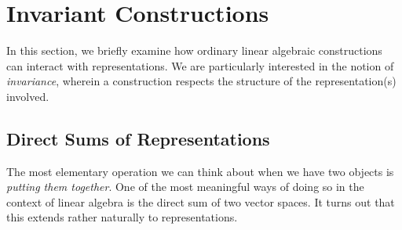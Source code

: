 \section{Invariant Constructions}

In this section, we briefly examine how ordinary linear algebraic constructions can interact with representations. We are particularly interested in the notion of \textit{invariance}, wherein a construction respects the structure of the representation(s) involved.

\subsection{Direct Sums of Representations}

The most elementary operation we can think about when we have two objects is \textit{putting them together}. One of the most meaningful ways of doing so in the context of linear algebra is the direct sum of two vector spaces. It turns out that this extends rather naturally to representations.

